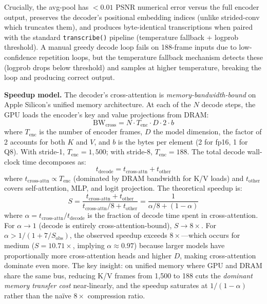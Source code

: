 \documentclass[11pt,a4paper]{article}
\begin{document}
Crucially, the avg-pool has $<0.01$ PSNR numerical error versus the full encoder output, preserves the decoder's positional embedding indices (unlike strided-conv which truncates them), and produces byte-identical transcriptions when paired with the standard \texttt{transcribe()} pipeline (temperature fallback + logprob threshold). A manual greedy decode loop fails on 188-frame inputs due to low-confidence repetition loops, but the temperature fallback mechanism detects these (logprob drops below threshold) and samples at higher temperature, breaking the loop and producing correct output.

\noindent\textbf{Speedup model.}
The decoder's cross-attention is \emph{memory-bandwidth-bound} on Apple Silicon's unified memory architecture. At each of the $N$ decode steps, the GPU loads the encoder's key and value projections from DRAM:
\begin{equation}
\text{BW}_{\text{cross}} = N \cdot T_{\text{enc}} \cdot D \cdot 2 \cdot b
\label{eq:bw_cross}
\end{equation}
where $T_{\text{enc}}$ is the number of encoder frames, $D$ the model dimension, the factor of 2 accounts for both $K$ and $V$, and $b$ is the bytes per element (2 for fp16, 1 for Q8). With stride-1, $T_{\text{enc}} = 1{,}500$; with stride-8, $T_{\text{enc}} = 188$. The total decode wall-clock time decomposes as:
\begin{equation}
t_{\text{decode}} = t_{\text{cross-attn}} + t_{\text{other}}
\end{equation}
where $t_{\text{cross-attn}} \propto T_{\text{enc}}$ (dominated by DRAM bandwidth for K/V loads) and $t_{\text{other}}$ covers self-attention, MLP, and logit projection. The theoretical speedup is:
\begin{equation}
S = \frac{t_{\text{cross-attn}} + t_{\text{other}}}{t_{\text{cross-attn}}/8 + t_{\text{other}}} = \frac{1}{\alpha / 8 + (1 - \alpha)}
\label{eq:speedup}
\end{equation}
where $\alpha = t_{\text{cross-attn}} / t_{\text{decode}}$ is the fraction of decode time spent in cross-attention. For $\alpha \to 1$ (decode is entirely cross-attention-bound), $S \to 8\times$. For $\alpha > 1/(1 + 7/S_{\text{obs}})$, the observed speedup exceeds $8\times$---which occurs for medium ($S = 10.71\times$, implying $\alpha \approx 0.97$) because larger models have proportionally more cross-attention heads and higher $D$, making cross-attention dominate even more. The key insight: on unified memory where GPU and DRAM share the same bus, reducing K/V frames from 1,500 to 188 cuts the \emph{dominant memory transfer cost} near-linearly, and the speedup saturates at $1/(1-\alpha)$ rather than the na\"ive $8\times$ compression ratio.
\end{document}
